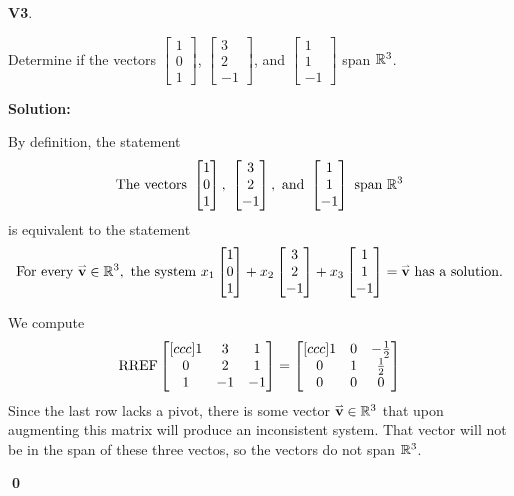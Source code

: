 \documentclass{article}
\newenvironment{problem}[1]
{
  \begin{flushleft}
  \textbf{#1}.
  \ignorespaces
}
{
  \end{flushleft}
}
\newenvironment{solution}
{
  \ignorespaces
  \textbf{Solution:}
}
{
  \ignorespacesafterend
  \begin{flushright}
  {\bfseries \qed}
  \end{flushright}
}
\begin{document}
\begin{problem}{V3}
Determine if  the vectors
\(\begin{bmatrix} 1 \\ 0 \\ 1 \end{bmatrix} \),
\(\begin{bmatrix} 3 \\ 2 \\ -1 \end{bmatrix} \), and
\(\begin{bmatrix} 1 \\ 1 \\ -1 \end{bmatrix} \) span \(\mathbb{R}^3\).
\end{problem}
\begin{solution}
By definition, the statement
\[\text{The vectors }\begin{bmatrix} 1 \\ 0 \\ 1 \end{bmatrix} ,\ 
\begin{bmatrix} 3 \\ 2 \\ -1 \end{bmatrix}, \text{ and }
\begin{bmatrix} 1 \\ 1 \\ -1 \end{bmatrix}  \text{ span } \IR^3\]
is equivalent to the statement
\[\text{For every }\mathbf{\accentset{\rightharpoonup}{v}} \in \mathbb{R}^3,\text{ the system }
x_1\begin{bmatrix} 1 \\ 0 \\ 1 \end{bmatrix}+  
x_2 \begin{bmatrix} 3 \\ 2 \\ -1 \end{bmatrix}+
x_3\begin{bmatrix} 1 \\ 1 \\ -1 \end{bmatrix}=\mathbf{\accentset{\rightharpoonup}{v}}\text{ has a solution.}\]


We compute
\[ \operatorname{RREF}
  \begin{bmatrix}[ccc]
  1 & 3 & 1  \\
  0 & 2 & 1  \\
  1 & -1 & -1
  \end{bmatrix}
  =
  \begin{bmatrix}[ccc]
  1 & 0 & -\frac{1}{2} \\
  0 & 1 & \frac{1}{2} \\
  0 & 0 & 0
  \end{bmatrix}
\]
Since the last row lacks a pivot, there is some vector \(\mathbf{\accentset{\rightharpoonup}{v}} \in \mathbb{R}^3\) that upon augmenting this matrix will produce
an inconsistent system. That vector will not be in the span of these three vectos, so the vectors do not span \(\mathbb{R}^3\).
\end{solution}
\end{document}
